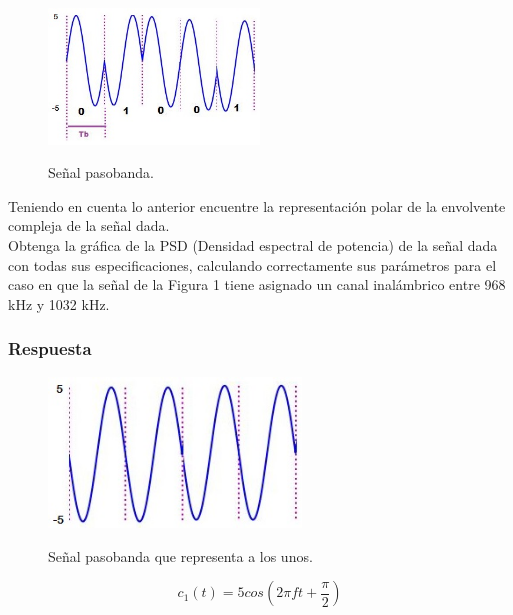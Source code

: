  \begin{figure}[h!]
	\captionsetup{justification = raggedright, singlelinecheck = false}
    \caption{Señal pasobanda.}
    \centering
    \includegraphics[width=0.5\textwidth]{Imagenes/pasobanda.JPG}
    \label{fig:senaldeceros}
\end{figure}



Teniendo en cuenta lo anterior encuentre la representación polar  de la envolvente compleja de la señal dada.\\

Obtenga la gráfica  de  la PSD (Densidad espectral de potencia) de la señal dada con todas sus  especificaciones, calculando correctamente sus parámetros  para el caso en que la señal de la Figura 1 tiene asignado un canal inalámbrico entre 968 kHz y 1032 kHz.

\subsubsection{Respuesta}

 \begin{figure}[h!]
	\captionsetup{justification = raggedright, singlelinecheck = false}
    \caption{Señal pasobanda que representa a los unos.}
    \centering
    \includegraphics[width=0.6\textwidth]{Imagenes/unos.JPG}
    \label{fig:senaldeunos}
\end{figure}

\begin{equation} \label{capdos_treinta}
c_{1}(t)=5cos(2\pi ft+\frac{\pi}{2})
\end{equation}



